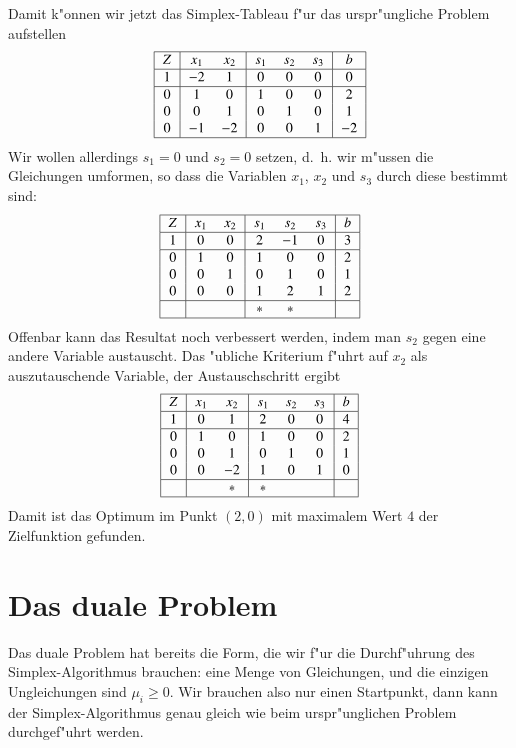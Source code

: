 \begin{beispiel}
Damit k"onnen wir jetzt das Simplex-Tableau f"ur das urspr"ungliche
Problem aufstellen
\[
\begin{tabular}{|>{$}c<{$}|>{$}c<{$}>{$}c<{$}|>{$}c<{$}>{$}c<{$}>{$}c<{$}|>{$}c<{$}|}
\hline
Z&x_1&x_2&s_1&s_2&s_3& b\\
\hline
1& -2&  1&  0&  0&  0& 0\\
\hline
0&  1&  0&  1&  0&  0& 2\\
0&  0&  1&  0&  1&  0& 1\\
0& -1& -2&  0&  0&  1&-2\\
\hline
\end{tabular}
\]
Wir wollen allerdings $s_1=0$ und $s_2=0$  setzen, d.~h. wir m"ussen
die Gleichungen umformen, so dass die Variablen $x_1$, $x_2$ und $s_3$ 
durch diese bestimmt sind:
\[
\begin{tabular}{|>{$}c<{$}|>{$}c<{$}>{$}c<{$}|>{$}c<{$}>{$}c<{$}>{$}c<{$}|>{$}c<{$}|}
\hline
Z&x_1&x_2&s_1&s_2&s_3& b\\
\hline
1&  0&  0&  2& -1&  0& 3\\
\hline
0&  1&  0&  1&  0&  0& 2\\
0&  0&  1&  0&  1&  0& 1\\
0&  0&  0&  1&  2&  1& 2\\
\hline
 &   &   &  *&  *&   &  \\
\hline
\end{tabular}
\]
Offenbar kann das Resultat noch verbessert werden, indem man $s_2$
gegen eine andere Variable austauscht. Das "ubliche Kriterium f"uhrt
auf $x_2$ als auszutauschende Variable, der Austauschschritt ergibt
\[
\begin{tabular}{|>{$}c<{$}|>{$}c<{$}>{$}c<{$}|>{$}c<{$}>{$}c<{$}>{$}c<{$}|>{$}c<{$}|}
\hline
Z&x_1&x_2&s_1&s_2&s_3& b\\
\hline
1&  0&  1&  2&  0&  0& 4\\
\hline
0&  1&  0&  1&  0&  0& 2\\
0&  0&  1&  0&  1&  0& 1\\
0&  0& -2&  1&  0&  1& 0\\
\hline
 &   &  *&  *&   &   &  \\
\hline
\end{tabular}
\]
Damit ist das Optimum im Punkt $(2, 0)$ mit maximalem Wert $4$ der Zielfunktion
gefunden.
\end{beispiel}

\section{Das duale Problem}
Das duale Problem hat bereits die Form, die wir f"ur die Durchf"uhrung des
Simplex-Algorithmus brauchen: eine Menge von Gleichungen, und die
einzigen Ungleichungen sind $\mu_i\ge 0$.
Wir brauchen also nur einen Startpunkt, dann kann der Simplex-Algorithmus
genau gleich wie beim urspr"unglichen Problem durchgef"uhrt werden.

